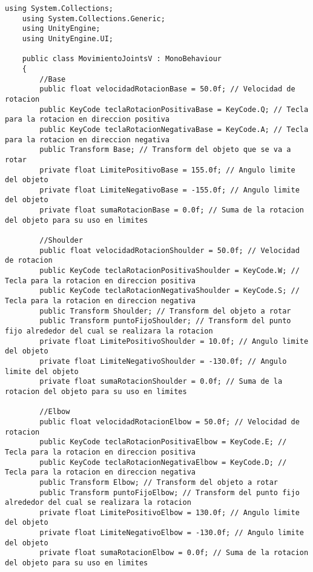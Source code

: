 \begin{lstlisting}[frame=single]
    using System.Collections;
    using System.Collections.Generic;
    using UnityEngine;
    using UnityEngine.UI;

    public class MovimientoJointsV : MonoBehaviour
    {
        //Base
        public float velocidadRotacionBase = 50.0f; // Velocidad de rotacion
        public KeyCode teclaRotacionPositivaBase = KeyCode.Q; // Tecla para la rotacion en direccion positiva
        public KeyCode teclaRotacionNegativaBase = KeyCode.A; // Tecla para la rotacion en direccion negativa
        public Transform Base; // Transform del objeto que se va a rotar
        private float LimitePositivoBase = 155.0f; // Angulo limite del objeto
        private float LimiteNegativoBase = -155.0f; // Angulo limite del objeto
        private float sumaRotacionBase = 0.0f; // Suma de la rotacion del objeto para su uso en limites

        //Shoulder
        public float velocidadRotacionShoulder = 50.0f; // Velocidad de rotacion
        public KeyCode teclaRotacionPositivaShoulder = KeyCode.W; // Tecla para la rotacion en direccion positiva
        public KeyCode teclaRotacionNegativaShoulder = KeyCode.S; // Tecla para la rotacion en direccion negativa
        public Transform Shoulder; // Transform del objeto a rotar
        public Transform puntoFijoShoulder; // Transform del punto fijo alrededor del cual se realizara la rotacion
        private float LimitePositivoShoulder = 10.0f; // Angulo limite del objeto
        private float LimiteNegativoShoulder = -130.0f; // Angulo limite del objeto
        private float sumaRotacionShoulder = 0.0f; // Suma de la rotacion del objeto para su uso en limites

        //Elbow
        public float velocidadRotacionElbow = 50.0f; // Velocidad de rotacion
        public KeyCode teclaRotacionPositivaElbow = KeyCode.E; // Tecla para la rotacion en direccion positiva
        public KeyCode teclaRotacionNegativaElbow = KeyCode.D; // Tecla para la rotacion en direccion negativa
        public Transform Elbow; // Transform del objeto a rotar
        public Transform puntoFijoElbow; // Transform del punto fijo alrededor del cual se realizara la rotacion
        private float LimitePositivoElbow = 130.0f; // Angulo limite del objeto
        private float LimiteNegativoElbow = -130.0f; // Angulo limite del objeto
        private float sumaRotacionElbow = 0.0f; // Suma de la rotacion del objeto para su uso en limites


\end{lstlisting}
